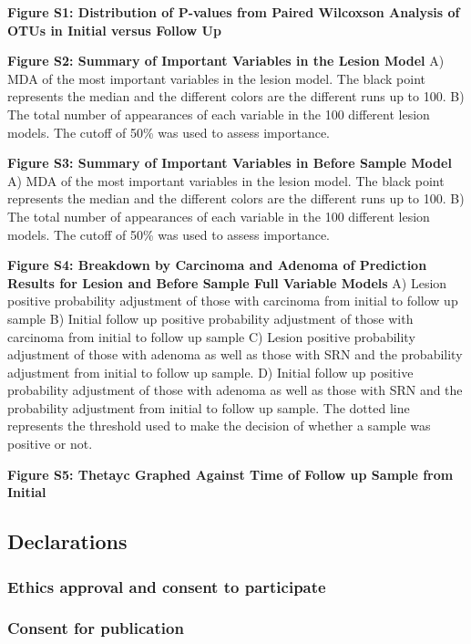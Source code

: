 \documentclass[12pt,]{article}
\begin{document}
\newpage

\textbf{Figure S1: Distribution of P-values from Paired Wilcoxson
Analysis of OTUs in Initial versus Follow Up}

\textbf{Figure S2: Summary of Important Variables in the Lesion Model}
A) MDA of the most important variables in the lesion model. The black
point represents the median and the different colors are the different
runs up to 100. B) The total number of appearances of each variable in
the 100 different lesion models. The cutoff of 50\% was used to assess
importance.

\textbf{Figure S3: Summary of Important Variables in Before Sample
Model} A) MDA of the most important variables in the lesion model. The
black point represents the median and the different colors are the
different runs up to 100. B) The total number of appearances of each
variable in the 100 different lesion models. The cutoff of 50\% was used
to assess importance.

\textbf{Figure S4: Breakdown by Carcinoma and Adenoma of Prediction
Results for Lesion and Before Sample Full Variable Models} A) Lesion
positive probability adjustment of those with carcinoma from initial to
follow up sample B) Initial follow up positive probability adjustment of
those with carcinoma from initial to follow up sample C) Lesion positive
probability adjustment of those with adenoma as well as those with SRN
and the probability adjustment from initial to follow up sample. D)
Initial follow up positive probability adjustment of those with adenoma
as well as those with SRN and the probability adjustment from initial to
follow up sample. The dotted line represents the threshold used to make
the decision of whether a sample was positive or not.

\textbf{Figure S5: Thetayc Graphed Against Time of Follow up Sample from
Initial}

\newpage

\subsection{Declarations}\label{declarations}

\subsubsection{Ethics approval and consent to
participate}\label{ethics-approval-and-consent-to-participate}

\subsubsection{Consent for publication}\label{consent-for-publication}
\end{document}
